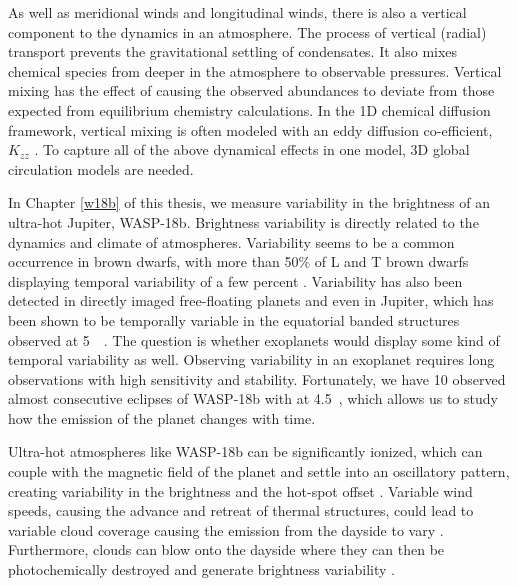 As well as meridional winds and longitudinal winds, there is also a vertical component to the dynamics in an atmosphere. The process of vertical (radial) transport prevents the gravitational settling of condensates. It also mixes chemical species from deeper in the atmosphere to observable pressures. Vertical mixing has the effect of causing the observed abundances to deviate from those expected from equilibrium chemistry calculations. In the 1D chemical diffusion framework, vertical mixing is often modeled with an eddy diffusion co-efficient, $K_{zz}$ \citep[e.g.][]{Zhang2018b, Miles2020}. To capture all of the above dynamical effects in one model, 3D global circulation models are needed.


In Chapter \ref{w18b} of this thesis, we measure variability in the brightness of an ultra-hot Jupiter, WASP-18b. Brightness variability is directly related to the dynamics and climate of atmospheres. Variability seems to be a common occurrence in brown dwarfs, with more than 50\% of L and T brown dwarfs displaying temporal variability of a few percent \citep{Metchev2015}. Variability has also been detected in directly imaged free-floating planets \citep{Biller2015} and even in Jupiter, which has been shown to be temporally variable in the equatorial banded structures observed at 5~\um~\citep{Antunano2019}. The question is whether exoplanets would display some kind of temporal variability as well. Observing variability in an exoplanet requires long observations with high sensitivity and stability. Fortunately, we have 10 observed almost consecutive eclipses of WASP-18b with \spitzerIRAC at 4.5~\um, which allows us to study how the emission of the planet changes with time.

Ultra-hot atmospheres like WASP-18b can be significantly ionized, which can couple with the magnetic field of the planet and settle into an oscillatory pattern, creating variability in the brightness and the hot-spot offset \citep{Rogers2017}. Variable wind speeds, causing the advance and retreat of thermal structures, could lead to variable cloud coverage causing the emission from the dayside to vary \citep{Armstrong2016}. Furthermore, clouds can blow onto the dayside where they can then be photochemically destroyed and generate brightness variability \citep{Jackson2019}.

